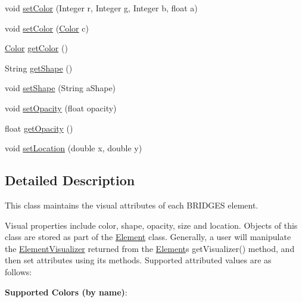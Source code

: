 \begin{DoxyCompactItemize}
\item 
void \mbox{\hyperlink{classbridges_1_1base_1_1_element_visualizer_a84fad1c8abe43b20c68c1800d7630918}{set\+Color}} (Integer r, Integer g, Integer b, float a)
\item 
void \mbox{\hyperlink{classbridges_1_1base_1_1_element_visualizer_a33172ab908f3b6f9740727b0bfe91565}{set\+Color}} (\mbox{\hyperlink{classbridges_1_1base_1_1_color}{Color}} c)
\item 
\mbox{\hyperlink{classbridges_1_1base_1_1_color}{Color}} \mbox{\hyperlink{classbridges_1_1base_1_1_element_visualizer_a3bf821b9bfa02746882bac934ce4fb8e}{get\+Color}} ()
\item 
String \mbox{\hyperlink{classbridges_1_1base_1_1_element_visualizer_a8ef0825745e49f32b57e4bf6c891b57e}{get\+Shape}} ()
\item 
void \mbox{\hyperlink{classbridges_1_1base_1_1_element_visualizer_ac3bad991904c8ad23e5233b341381d93}{set\+Shape}} (String a\+Shape)
\item 
void \mbox{\hyperlink{classbridges_1_1base_1_1_element_visualizer_a932f62eb1bd0c92da265a7f903dd0790}{set\+Opacity}} (float opacity)
\item 
float \mbox{\hyperlink{classbridges_1_1base_1_1_element_visualizer_ab86ff39f17f8d1766670b18be88b5492}{get\+Opacity}} ()
\item 
void \mbox{\hyperlink{classbridges_1_1base_1_1_element_visualizer_a04f3416447f2042de7cd21ce5b6a0598}{set\+Location}} (double x, double y)
\end{DoxyCompactItemize}


\subsection{Detailed Description}
This class maintains the visual attributes of each B\+R\+I\+D\+G\+ES element. 

Visual properties include color, shape, opacity, size and location. Objects of this class are stored as part of the \mbox{\hyperlink{classbridges_1_1base_1_1_element}{Element}} class. Generally, a user will manipulate the \mbox{\hyperlink{classbridges_1_1base_1_1_element_visualizer}{Element\+Visualizer}} returned from the \mbox{\hyperlink{classbridges_1_1base_1_1_element}{Element}}\textquotesingle{}s get\+Visualizer() method, and then set attributes using its methods. Supported attributed values are as follows\+:~\newline


{\bfseries{Supported Colors (by name)}}\+: 

